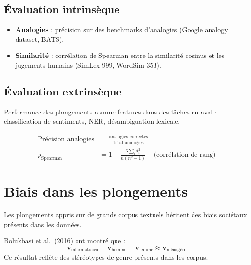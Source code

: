 \subsection{\'Evaluation intrins\`eque}

\begin{itemize}
    \item \textbf{Analogies} : pr\'ecision sur des benchmarks d'analogies
          (Google analogy dataset, BATS).
    \item \textbf{Similarit\'e} : corr\'elation de Spearman entre la similarit\'e
          cosinus et les jugements humains (SimLex-999, WordSim-353).
\end{itemize}

\subsection{\'Evaluation extrins\`eque}

Performance des plongements comme features dans des t\^aches en aval :
classification de sentiments, NER, d\'esambiguation lexicale.

\begin{formules}[title=\textbf{M\'etriques d'\'evaluation des plongements}]
\begin{align}
\text{Pr\'ecision analogies} &= \frac{\text{analogies correctes}}{\text{total analogies}} \\
\rho_{\text{Spearman}} &= 1 - \frac{6 \sum_i d_i^2}{n(n^2 - 1)} & \text{(corr\'elation de rang)}
\end{align}
\end{formules}

\section{Biais dans les plongements}
\label{sec:plg:biais}

Les plongements appris sur de grands corpus textuels h\'eritent des biais
soci\'etaux pr\'esents dans les donn\'ees.

\begin{exemple}
Bolukbasi et al.\ (2016) ont montr\'e que :
\[
\mathbf{v}_{\text{informaticien}} - \mathbf{v}_{\text{homme}} + \mathbf{v}_{\text{femme}} \approx \mathbf{v}_{\text{m\'enag\`ere}}
\]
Ce r\'esultat refl\`ete des st\'er\'eotypes de genre pr\'esents dans les corpus.
\end{exemple}


